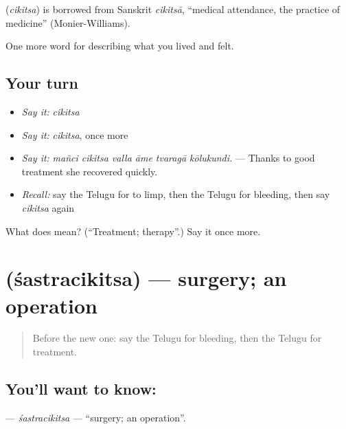 \begin{cousinweb}
\textbf{} (\emph{cikitsa}) is borrowed from Sanskrit \emph{cikitsā}, \textquotedblleft{}medical attendance, the practice of medicine\textquotedblright{} (Monier-Williams).
\end{cousinweb}

\begin{grammarlens}[title={What you've built}]
One more word for describing what you lived and felt.
\end{grammarlens}

\subsection*{Your turn}
\begin{itemize}
\raggedright
  \item \emph{Say it:} \emph{cikitsa}
  \item \emph{Say it:} \emph{cikitsa}, once more
  \item \emph{Say it:} \emph{mañci cikitsa valla āme tvaragā kōlukundi.} — Thanks to good treatment she recovered quickly.
  \item \emph{Recall:} say the Telugu for to limp, then the Telugu for bleeding, then say \emph{cikitsa} again
\end{itemize}

\begin{tcolorbox}[breakable,colback=teal!4,colframe=teal!35!black,title={Before you move on}]
What does  mean? (\textquotedblleft{}Treatment; therapy\textquotedblright{}.) Say it once more.
\end{tcolorbox}
\section[\texorpdfstring{\te{శస్త్రచికిత్స} (śastracikitsa)}{శస్త్రచికిత్స (śastracikitsa)}]{ (śastracikitsa) — surgery; an operation}

\label{lesson:TE-C519-sastracikitsa}



\begin{quote}
Before the new one: say the Telugu for bleeding, then the Telugu for treatment.
\end{quote}

\subsection*{You'll want to know: }
\textbf{} — \emph{śastracikitsa} — \textquotedblleft{}surgery; an operation\textquotedblright{}.


